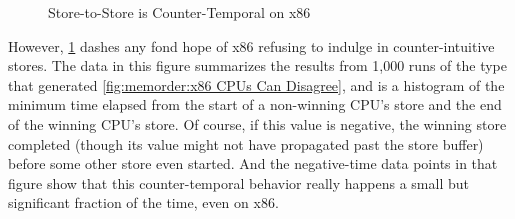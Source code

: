 {\begin{figure}
\centering
{}
\caption{Store-to-Store is Counter-Temporal on x86}
\label{fig:memorder:Store-to-Store is Counter-Temporal on x86}
\end{figure}

	However,
	\cref{fig:memorder:Store-to-Store is Counter-Temporal on x86}
	dashes any fond hope of x86 refusing to indulge in
	counter-intuitive stores.
	The data in this figure summarizes the results from 1,000 runs
	of the type that generated
	\cref{fig:memorder:x86 CPUs Can Disagree},
	and is a histogram of the minimum time elapsed from the start of
	a non-winning CPU's store and the end of the winning CPU's store.
	Of course, if this value is negative, the winning store completed
	(though its value might not have propagated past the store buffer)
	before some other store even started.
	And the negative-time data points in that figure show that this
	counter-temporal behavior really happens a small but significant
	fraction of the time, even on x86.

}
